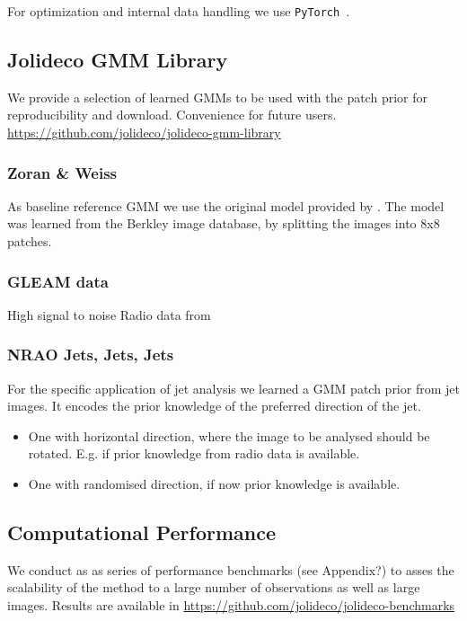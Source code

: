 \documentclass[twocolumn]{aastex631}
\begin{document}
    For optimization and internal data handling we use \texttt{PyTorch}~\citep{Pytorch2019}.

    \subsection{Jolideco GMM Library}
    We provide a selection of learned GMMs to be used with the patch prior for reproducibility and download. 
    Convenience for future users. \url{https://github.com/jolideco/jolideco-gmm-library}
    
    \subsubsection{Zoran \& Weiss}
    As baseline reference GMM we use the original model provided by \cite{Zoran2011}. The model was learned
    from the Berkley image database, by splitting the images into 8x8 patches. 

    \subsubsection{GLEAM data}
    High signal to noise Radio data from \cite{HurleyWalker2022}

    \subsubsection{NRAO Jets, Jets, Jets}
    For the specific application of jet analysis we learned a GMM patch prior from jet images. It encodes the prior knowledge of the preferred direction of the jet. 

    \begin{itemize}
        \item One with horizontal direction, where the image to be analysed should be rotated. E.g. if prior knowledge from radio data is available.
        \item One with randomised direction, if now prior knowledge is available.
    \end{itemize}
    

    \subsection{Computational Performance}
    We conduct as as series of performance benchmarks (see Appendix?) to asses the scalability of the method to a large number of observations
    as well as large images. Results are available in \url{https://github.com/jolideco/jolideco-benchmarks}
    
\end{document}
